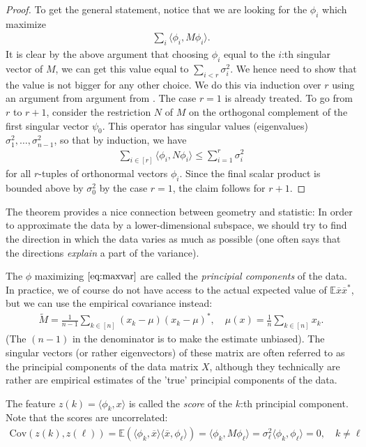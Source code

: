 \documentclass{article}
\newcommand{\erw}{\mathbb{E}} %
\newcommand{\sprod}[1]{\langle #1 \rangle}
\begin{document}
\begin{proof}
To get the general statement, notice that we are looking for the $\phi_i$ which maximize
\begin{align*}
    \sum_i \sprod{\phi_i,M\phi_i}.
\end{align*}
It is clear by the above argument that choosing $\phi_i$ equal to the $i$:th singular vector of $M$, we can get this value equal to $\sum_{i< r}\sigma_i^2$. We hence need to show that the value is not bigger for any other choice. We do this via induction over $r$ using an argument from argument from \cite{tao2012topics}. The case $r=1$ is already treated. To go from $r$ to $r+1$, consider the restriction $N$ of $M$ on the orthogonal complement of the first singular vector $\psi_0$. This operator has singular values (eigenvalues) $\sigma_1^2, \dots, \sigma_{n-1}^2$, so that by induction, we have
\begin{align*}
     \sum_{i\in [r]} \sprod{\phi_i,N\phi_i} \leq \sum_{i=1}^r \sigma_i^2
\end{align*}
for all $r$-tuples of orthonormal vectors $\phi_i$. Since the final scalar product is bounded above by $\sigma_0^2$ by the case $r=1$, the claim follows for $r+1$.
\end{proof}

The theorem provides a nice connection between geometry and statistic: In order to approximate the data by a lower-dimensional subspace, we should try to find the direction in which the data varies as much as possible (one often says that the directions \emph{explain} a part of the variance). 


The $\phi$ maximizing $\eqref{eq:maxvar}$ are called the \emph{principial components} of the data. In practice, we of course do not have access to the actual expected value of $\erw{\overline{x}\overline{x}^*}$, but we can use the empirical covariance instead:
\begin{align*}
  \tilde{M} = \frac{1}{n-1} \sum_{k\in [n]} (x_k - \mu)(x_k-\mu)^*, \quad  \mu(x) = \tfrac{1}{n} \sum_{k \in [n]} x_k.
\end{align*}
(The $(n-1)$ in the denominator is to make the estimate unbiased). The singular vectors (or rather eigenvectors) of these matrix are often referred to as the principial components of the data matrix $X$, although they technically are rather are empirical estimates of the 'true' principial components of the data.

The feature $z(k)=\sprod{\phi_k,x}$ is called the \emph{score} of the $k$:th principial component. Note that the scores are uncorrelated:
\begin{align*}
    \mathrm{Cov}(z(k),z(\ell)) = \mathbb{E}(\sprod{\phi_k,\overline{x}}\sprod{\overline{x},\phi_\ell}) = \sprod{\phi_k,M\phi_\ell} = \sigma_\ell^2 \sprod{\phi_k,\phi_\ell}=0, \quad k\neq \ell
\end{align*}
\end{document}
